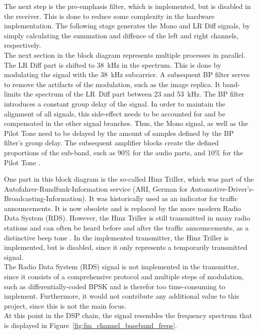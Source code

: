 The next step is the pre-emphasis filter, which is implemented, but is disabled in the receiver.
This is done to reduce some complexity in the hardware implementation.
The following stage generates the Mono and LR Diff signals, by simply calculating the summation and diffence of the left and right channels, respectively.\\

The next section in the block diagram represents multiple processes in parallel.
The LR Diff part is shifted to 38~kHz in the spectrum.
This is done by modulating the signal with the 38~kHz subcarrier.
A subsequent BP filter serves to remove the artifacts of the modulation, such as the image replica.
It band-limits the spectrum of the LR~Diff part between 23 and 53~kHz.
The BP filter introduces a constant group delay of the signal.
In order to maintain the alignment of all signals, this side-effect needs to be accounted for and be compensated in the other signal branches.
Thus, the Mono signal, as well as the Pilot Tone need to be delayed by the amount of samples defined by the BP filter's group delay.
The subsequent amplifier blocks create the defined proportions of the sub-band, such as 90\% for the audio parts, and 10\% for the Pilot Tone \cite{FmMultiplexingForStereo}.

One part in this block diagram is the so-called Hinz Triller, which was part of the Autofahrer-Rundfunk-Information service (ARI, German for Automotive-Driver's-Broadcasting-Information).
It was historically used as an indicator for traffic announcements.
It is now obsolete and is replaced by the more modern Radio Data System (RDS).
However, the Hinz Triller is still transmitted in many radio stations and can often be heard before and after the traffic announcements, as a distinctive beep tone \cite{HinzTriller}.
In the implemented transmitter, the Hinz Triller is implemented, but is disabled, since it only represents a temporarily transmitted signal.\\

The Radio Data System (RDS) signal is not implemented in the transmitter, since it consists of a comprehensive protocol and multiple steps of modulation, such as differentially-coded BPSK \cite{IntroFmStereoRdsModulation} and is therefor too time-consuming to implement.
Furthermore, it would not contribute any additional value to this project, since this is not the main focus.\\

At this point in the DSP chain, the signal resembles the frequency spectrum that is displayed in Figure~\ref{fig:fm_channel_baseband_freqs}.\\

